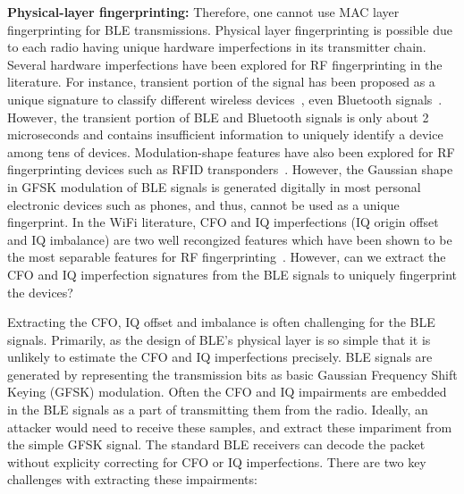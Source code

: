 \vspace{0.5em} \noindent\textbf{Physical-layer fingerprinting:}
Therefore, one cannot use MAC layer fingerprinting for BLE transmissions.
%
Physical layer fingerprinting is possible due to each radio having unique
hardware imperfections in its transmitter chain.
%
Several hardware imperfections have been explored for RF fingerprinting in the literature. 
For instance, transient portion of the signal has been proposed as a unique signature to 
classify different wireless devices~\cite{extraction_rehman, transientID_danev}, even Bluetooth
signals~\cite{transientBT_Hall}. However, the transient portion of BLE and Bluetooth signals
is only about 2 microseconds and contains insufficient information to uniquely identify 
a device among tens of devices. Modulation-shape features have also been explored for RF
fingerprinting devices such as RFID transponders~\cite{rfidphysical_danev}. However, 
the Gaussian shape in GFSK modulation of BLE signals is generated digitally in most 
personal electronic devices such as phones, and thus, cannot be used as a unique fingerprint.
In the WiFi literature, CFO and IQ imperfections (IQ origin offset and IQ imbalance) are 
two well recongized features which have been shown to be the most separable features for 
RF fingerprinting~\cite{Brik_radiometric}. However, can we extract the CFO and IQ imperfection signatures from the
BLE signals to uniquely fingerprint the devices?

Extracting the CFO, IQ offset and imbalance is often challenging for the BLE signals.  
%
Primarily, as the design of BLE's physical layer is so simple that it is unlikely to
estimate the CFO and IQ imperfections precisely.
%
% 
BLE signals are generated by representing the transmission bits as basic 
Gaussian Frequency Shift Keying (GFSK) modulation. Often the CFO and IQ impairments 
are embedded in the BLE signals as a part of transmitting them from the radio.
Ideally, an attacker would need to receive these samples, and extract these impariment 
from the simple GFSK signal. The standard BLE receivers can decode the 
packet without explicity correcting for CFO or IQ imperfections. There are two key challenges 
with extracting these impairments:

